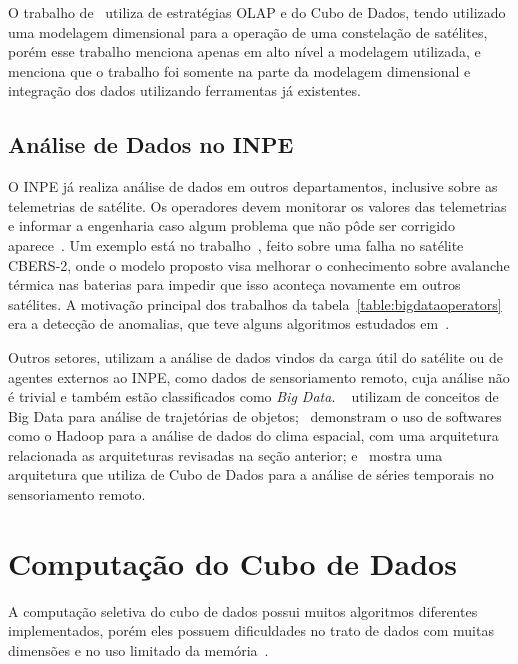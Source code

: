 O trabalho de~\cite{yvernesCopernicusGroundSegment2018} utiliza de estratégias OLAP e do Cubo de Dados, tendo utilizado uma modelagem dimensional para a operação de uma constelação de satélites, porém esse trabalho menciona apenas em alto nível a modelagem utilizada, e menciona que o trabalho foi somente na parte da modelagem dimensional e integração dos dados utilizando ferramentas já existentes.

\subsection{Análise de Dados no INPE}\label{ch:corr:inpe}

O INPE já realiza análise de dados em outros departamentos, inclusive sobre as telemetrias de satélite.
Os operadores devem monitorar os valores das telemetrias e informar a engenharia caso algum problema que não pôde ser corrigido aparece~\cite{TominagaFerrAmbr:2017:CoSaTe}.
Um exemplo está no trabalho~\cite{Magalhaes:2012:EsAvTe}, feito sobre uma falha no satélite CBERS-2, onde o modelo proposto visa melhorar o conhecimento sobre avalanche térmica nas baterias para impedir que isso aconteça novamente em outros satélites.
A motivação principal dos trabalhos da tabela~\ref{table:bigdataoperators} era a detecção de anomalias, que teve alguns algoritmos estudados em~\cite{AzevedoAmbrViei::EsSoTe}.

Outros setores, utilizam a análise de dados vindos da carga útil do satélite ou de agentes externos ao INPE, como dados de sensoriamento remoto, cuja análise não é trivial e também estão classificados como \textit{Big Data}.
~ utilizam de conceitos de Big Data para análise de trajetórias de objetos;~ demonstram o uso de softwares como o Hadoop para a análise de dados do clima espacial, com uma arquitetura relacionada as arquiteturas revisadas na seção anterior; e~ mostra uma arquitetura que utiliza de Cubo de Dados para a análise de séries temporais no sensoriamento remoto.

\section{Computação do Cubo de Dados}\label{ch:corr:cube}

A computação seletiva do cubo de dados possui muitos algoritmos diferentes implementados, porém eles possuem dificuldades no trato de dados com muitas dimensões e no uso limitado da memória~\cite{hanDataMiningConcepts2011}.

